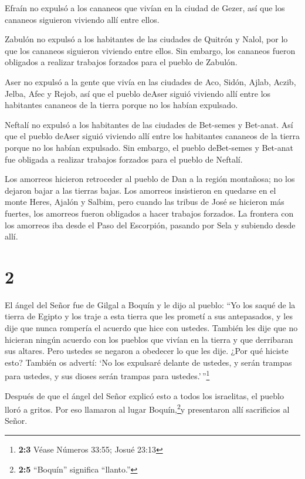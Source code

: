  Efraín no expulsó a los cananeos que vivían en la ciudad
de Gezer, así que los cananeos siguieron viviendo allí entre ellos.

 Zabulón no expulsó a los habitantes de las ciudades de
Quitrón y Nalol, por lo que los cananeos siguieron viviendo entre ellos.
Sin embargo, los cananeos fueron obligados a realizar trabajos forzados
para el pueblo de Zabulón.

 Aser no expulsó a la gente que vivía en las ciudades de
Aco, Sidón, Ajlab, Aczib, Jelba, Afec y Rejob,  así que el
pueblo deAser siguió viviendo allí entre los habitantes cananeos de la
tierra porque no los habían expulsado.

 Neftalí no expulsó a los habitantes de las ciudades de
Bet-semes y Bet-anat. Así que el pueblo deAser siguió viviendo allí
entre los habitantes cananeos de la tierra porque no los habían
expulsado. Sin embargo, el pueblo deBet-semes y Bet-anat fue obligada a
realizar trabajos forzados para el pueblo de Neftalí.

 Los amorreos hicieron retroceder al pueblo de Dan a la
región montañosa; no los dejaron bajar a las tierras bajas.
 Los amorreos insistieron en quedarse en el monte Heres,
Ajalón y Salbim, pero cuando las tribus de José se hicieron más fuertes,
los amorreos fueron obligados a hacer trabajos forzados. 
La frontera con los amorreos iba desde el Paso del Escorpión, pasando
por Sela y subiendo desde allí.

\hypertarget{section-1}{%
\section{2}\label{section-1}}

 El ángel del Señor fue de Gilgal a Boquín y le dijo al
pueblo: ``Yo los saqué de la tierra de Egipto y los traje a esta tierra
que les prometí a sus antepasados, y les dije que nunca rompería el
acuerdo que hice con ustedes.  También les dije que no
hicieran ningún acuerdo con los pueblos que vivían en la tierra y que
derribaran sus altares. Pero ustedes se negaron a obedecer lo que les
dije. ¿Por qué hiciste esto?  También os advertí: `No los
expulsaré delante de ustedes, y serán trampas para ustedes, y sus dioses
serán trampas para ustedes.'\,''\footnote{\textbf{2:3} Véase Números
  33:55; Josué 23:13}

 Después de que el ángel del Señor explicó esto a todos los
israelitas, el pueblo lloró a gritos.  Por eso llamaron al
lugar Boquín,\footnote{\textbf{2:5} ``Boquín'' significa ``llanto.''}y
presentaron allí sacrificios al Señor.

